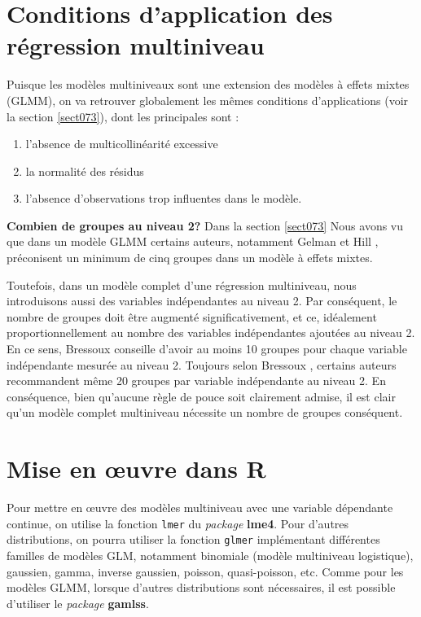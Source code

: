\documentclass[
  11pt,
  french,
]{book}
\providecommand{\tightlist}{%
  \setlength{\itemsep}{0pt}\setlength{\parskip}{0pt}}
\begin{document}
\hypertarget{sect083}{%
\section{Conditions d'application des régression multiniveau}\label{sect083}}

Puisque les modèles multiniveaux sont une extension des modèles à effets mixtes (GLMM), on va retrouver globalement les mêmes conditions d'applications (voir la section \ref{sect073}), dont les principales sont :

\begin{enumerate}
\def\labelenumi{\arabic{enumi}.}
\tightlist
\item
  l'absence de multicollinéarité excessive
\item
  la normalité des résidus
\item
  l'absence d'observations trop influentes dans le modèle.
\end{enumerate}

\textbf{Combien de groupes au niveau 2?} Dans la section \ref{sect073} Nous avons vu que dans un modèle GLMM certains auteurs, notamment Gelman et Hill
\citeyearpar{gelman2006data}, préconisent un minimum de cinq groupes dans un modèle à effets mixtes.

Toutefois, dans un modèle complet d'une régression multiniveau, nous introduisons aussi des variables indépendantes au niveau 2. Par conséquent, le nombre de groupes doit être augmenté significativement, et ce, idéalement proportionnellement au nombre des variables indépendantes ajoutées au niveau 2. En ce sens, Bressoux \citeyearpar[p.~325]{bressoux2010} conseille d'avoir au moins 10 groupes pour chaque variable indépendante mesurée au niveau 2. Toujours selon Bressoux \citeyearpar[p.~325]{bressoux2010}, certains auteurs recommandent même 20 groupes par variable indépendante au niveau 2. En conséquence, bien qu'aucune règle de pouce soit clairement admise, il est clair qu'un modèle complet multiniveau nécessite un nombre de groupes conséquent.

\hypertarget{sect084}{%
\section{Mise en œuvre dans R}\label{sect084}}

Pour mettre en œuvre des modèles multiniveau avec une variable dépendante continue, on utilise la fonction \texttt{lmer} du \emph{package} \textbf{lme4}. Pour d'autres distributions, on pourra utiliser la fonction \texttt{glmer} implémentant différentes familles de modèles GLM, notamment binomiale (modèle multiniveau logistique), gaussien, gamma, inverse gaussien, poisson, quasi-poisson, etc. Comme pour les modèles GLMM, lorsque d'autres distributions sont nécessaires, il est possible d'utiliser le \emph{package} \textbf{gamlss}.
\end{document}
